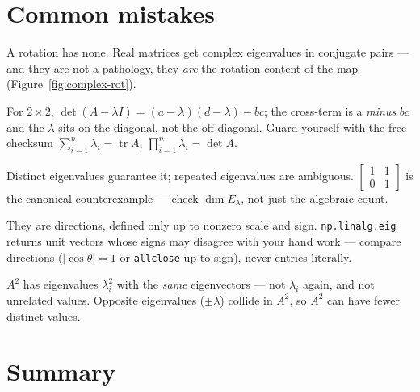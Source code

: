 \section{Common mistakes}

\begin{tripwire}
A rotation has none. Real matrices get complex eigenvalues in conjugate
pairs --- and they are not a pathology, they \emph{are} the rotation
content of the map (Figure~\ref{fig:complex-rot}).
\end{tripwire}

\begin{tripwire}
For $2\times2$, $\det(A-\lambda I)=(a-\lambda)(d-\lambda)-bc$; the
cross-term is a \emph{minus} $bc$ and the $\lambda$ sits on the diagonal,
not the off-diagonal. Guard yourself with the free checksum
$\sum_{i=1}^{n}\lambda_i=\operatorname{tr}A$, $\prod_{i=1}^{n}\lambda_i=\det A$.
\end{tripwire}

\begin{tripwire}
Distinct eigenvalues guarantee it; repeated eigenvalues are ambiguous.
$\begin{bmatrix}1&1\\0&1\end{bmatrix}$ is the canonical counterexample ---
check $\dim E_\lambda$, not just the algebraic count.
\end{tripwire}

\begin{tripwire}
They are directions, defined only up to nonzero scale and sign.
\texttt{np.linalg.eig} returns unit vectors whose signs may disagree with
your hand work --- compare directions ($|\cos\theta|=1$ or
\texttt{allclose} up to sign), never entries literally.
\end{tripwire}

\begin{tripwire}
$A^2$ has eigenvalues $\lambda_i^2$ with the \emph{same} eigenvectors ---
not $\lambda_i$ again, and not unrelated values. Opposite eigenvalues
($\pm\lambda$) collide in $A^2$, so $A^2$ can have fewer distinct values.
\end{tripwire}

\section{Summary}

